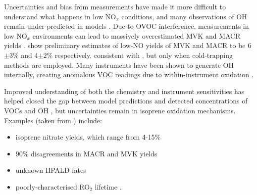       
      Uncertainties and bias from measurements have made it more difficult to understand what happens in low NO$_x$ conditions, and many observations of OH remain under-predicted in models \parencite{Mao2012}.
      Due to OVOC interference, measurements in low NO$_x$ environments can lead to massively overestimated MVK and MACR yields \parencite{Nguyen2014}.
      \textcite{Nguyen2014} show preliminary estimates of low-NO yields of MVK and MACR to be 6$\pm3\%$ and 4$\pm2\%$ respectively, consistent with \textcite{Liu2013}, but only when cold-trapping methods are employed.
      Many instruments have been shown to generate OH internally, creating anomalous VOC readings due to within-instrument oxidation \parencite{Mao2012}.
      
      
      
      Improved understanding of both the chemistry and instrument sensitivities has helped closed the gap between model predictions and detected concentrations of VOCs and OH \parencite{Mao2012}, but uncertainties remain in isoprene oxidation mechanisms.
      Examples (taken from \textcite{Nguyen2014}) include: 
      \begin{itemize}
        \item isoprene nitrate yields, which range from 4-15\% \parencite{Fisher2016}
        \item 90\% disagreements in MACR and MVK yields \parencite{Liu2013}
        \item unknown HPALD fates %
         \parencite{Peeters2009, Crounse2013}
        \item poorly-characterised RO$_2$ lifetime \parencite{Wolfe2012}.
      \end{itemize}
      

